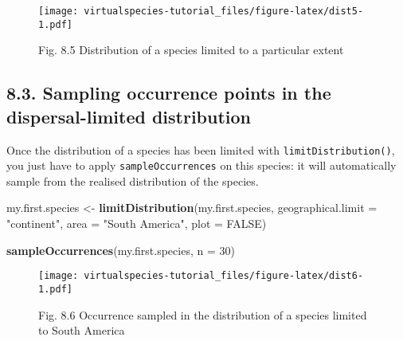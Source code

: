 \documentclass[]{article}
\newenvironment{Shaded}{\begin{snugshade}}{\end{snugshade}}
\newcommand{\KeywordTok}[1]{\textcolor[rgb]{0.13,0.29,0.53}{\textbf{#1}}}
\newcommand{\DataTypeTok}[1]{\textcolor[rgb]{0.13,0.29,0.53}{#1}}
\newcommand{\DecValTok}[1]{\textcolor[rgb]{0.00,0.00,0.81}{#1}}
\newcommand{\StringTok}[1]{\textcolor[rgb]{0.31,0.60,0.02}{#1}}
\newcommand{\OtherTok}[1]{\textcolor[rgb]{0.56,0.35,0.01}{#1}}
\newcommand{\NormalTok}[1]{#1}
\begin{document}
\begin{figure}
\centering
\texttt{[image: virtualspecies-tutorial\_files/figure-latex/dist5-1.pdf]}
\caption{Fig. 8.5 Distribution of a species limited to a particular
extent}
\end{figure}

\subsection{8.3. Sampling occurrence points in the dispersal-limited
distribution}\label{sampling-occurrence-points-in-the-dispersal-limited-distribution}

Once the distribution of a species has been limited with
\texttt{limitDistribution()}, you just have to apply
\texttt{sampleOccurrences} on this species: it will automatically sample
from the realised distribution of the species.

\begin{Shaded}
\begin{Highlighting}[]
\NormalTok{my.first.species <-}\StringTok{ }\KeywordTok{limitDistribution}\NormalTok{(my.first.species, }
                                      \DataTypeTok{geographical.limit =} \StringTok{"continent"}\NormalTok{,}
                                      \DataTypeTok{area =} \StringTok{"South America"}\NormalTok{,}
                                      \DataTypeTok{plot =} \OtherTok{FALSE}\NormalTok{)}

\KeywordTok{sampleOccurrences}\NormalTok{(my.first.species, }\DataTypeTok{n =} \DecValTok{30}\NormalTok{)}
\end{Highlighting}
\end{Shaded}

\begin{figure}
\centering
\texttt{[image: virtualspecies-tutorial\_files/figure-latex/dist6-1.pdf]}
\caption{Fig. 8.6 Occurrence sampled in the distribution of a species
limited to South America}
\end{figure}
\end{document}
